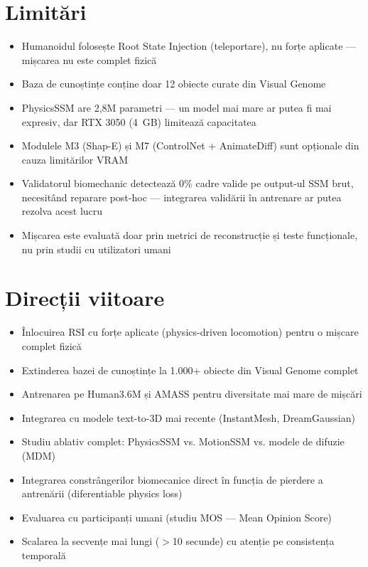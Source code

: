 \section{Limitări}

\begin{itemize}
    \item Humanoidul folosește Root State Injection (teleportare), nu forțe aplicate --- mișcarea nu este complet fizică
    \item Baza de cunoștințe conține doar 12 obiecte curate din Visual Genome
    \item PhysicsSSM are 2,8M parametri --- un model mai mare ar putea fi mai expresiv, dar RTX 3050 (4~GB) limitează capacitatea
    \item Modulele M3 (Shap-E) și M7 (ControlNet + AnimateDiff) sunt opționale din cauza limitărilor VRAM
    \item Validatorul biomechanic detectează 0\% cadre valide pe output-ul SSM brut, necesitând reparare post-hoc --- integrarea validării în antrenare ar putea rezolva acest lucru
    \item Mișcarea este evaluată doar prin metrici de reconstrucție și teste funcționale, nu prin studii cu utilizatori umani
\end{itemize}

\section{Direcții viitoare}

\begin{itemize}
    \item Înlocuirea RSI cu forțe aplicate (physics-driven locomotion) pentru o mișcare complet fizică
    \item Extinderea bazei de cunoștințe la 1.000+ obiecte din Visual Genome complet
    \item Antrenarea pe Human3.6M și AMASS pentru diversitate mai mare de mișcări
    \item Integrarea cu modele text-to-3D mai recente (InstantMesh, DreamGaussian)
    \item Studiu ablativ complet: PhysicsSSM vs. MotionSSM vs. modele de difuzie (MDM)
    \item Integrarea constrângerilor biomecanice direct în funcția de pierdere a antrenării (diferentiable physics loss)
    \item Evaluarea cu participanți umani (studiu MOS --- Mean Opinion Score)
    \item Scalarea la secvențe mai lungi ($>$10 secunde) cu atenție pe consistența temporală
\end{itemize}
